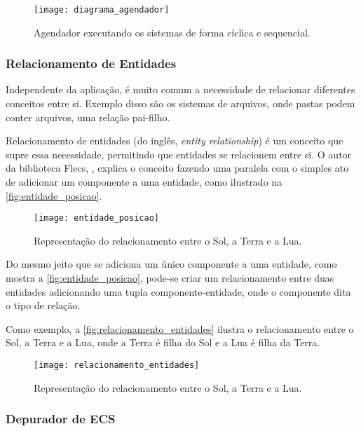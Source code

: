 \begin{figure}[H]
	\centering
	\texttt{[image: diagrama\_agendador]}
	\caption{Agendador executando os sistemas de forma cíclica e sequencial.}
	\label{fig:diagrama_agendador}
\end{figure}

\subsubsection{Relacionamento de Entidades}

Independente da aplicação, é muito comum a necessidade de relacionar diferentes conceitos entre si. Exemplo disso são os sistemas de arquivos, onde pastas podem conter arquivos, uma relação pai-filho.

Relacionamento de entidades (do inglês, \textit{entity relationship}) é um conceito que supre essa necessidade, permitindo que entidades se relacionem entre si. O autor da biblioteca Flecs, \citeauthor{flecs}, explica o conceito fazendo uma paralela com o simples ato de adicionar um componente a uma entidade, como ilustrado na \autoref{fig:entidade_posicao}.

\begin{figure}[H]
	\centering
	\texttt{[image: entidade\_posicao]}
	\caption{Representação do relacionamento entre o Sol, a Terra e a Lua.}
	\label{fig:entidade_posicao}
\end{figure}

Do mesmo jeito que se adiciona um único componente a uma entidade, como mostra a \autoref{fig:entidade_posicao}, pode-se criar um relacionamento entre duas entidades adicionando uma tupla componente-entidade, onde o componente dita o tipo de relação.

Como exemplo, a \autoref{fig:relacionamento_entidades} ilustra o relacionamento entre o Sol, a Terra e a Lua, onde a Terra é filha do Sol e a Lua é filha da Terra.

\begin{figure}[H]
	\centering
	\texttt{[image: relacionamento\_entidades]}
	\caption{Representação do relacionamento entre o Sol, a Terra e a Lua.}
	\label{fig:relacionamento_entidades}
\end{figure}

\subsubsection{Depurador de ECS}

